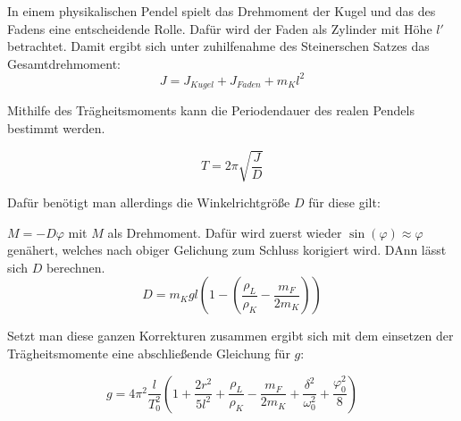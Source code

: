 In einem physikalischen Pendel spielt das Drehmoment der Kugel und das des Fadens eine entscheidende Rolle.
Dafür wird der Faden als Zylinder mit Höhe $l'$ betrachtet. Damit ergibt sich unter zuhilfenahme des Steinerschen Satzes das Gesamtdrehmoment:
\begin{equation}
    J = J_{Kugel} + J_ {Faden} + m_Kl^2
\end{equation}

Mithilfe des Trägheitsmoments kann die Periodendauer des realen Pendels bestimmt werden.

\begin{equation}
    T = 2 \pi \sqrt{\frac{J}{D}}
\end{equation}

Dafür benötigt man allerdings die Winkelrichtgröße $D$ für diese gilt:

$M = -D \varphi$
mit $M$ als Drehmoment.
Dafür wird zuerst wieder $\sin(\varphi) \approx \varphi$ genähert, welches nach obiger Gelichung zum Schluss korigiert wird.
DAnn lässt sich $D$ berechnen.
\begin{equation}
    D = m_K g l \left( 1 - \left(\frac{\rho_L}{\rho_K}- \frac{m_F}{2 m_K}\right)\right)
\end{equation}

Setzt man diese ganzen Korrekturen zusammen ergibt sich mit dem einsetzen der Trägheitsmomente eine abschließende Gleichung für $g$:

\begin{equation}
    g = 4 \pi^2 \frac{l}{T_0^2}\left(1 + \frac{2 r^2}{5l^2}+  \frac{\rho_L}{\rho_K}- \frac{m_F}{2 m_K} + \frac{\delta^2}{\omega_0 ^2} +\frac{\varphi_0^2}{8}\right)
\end{equation}